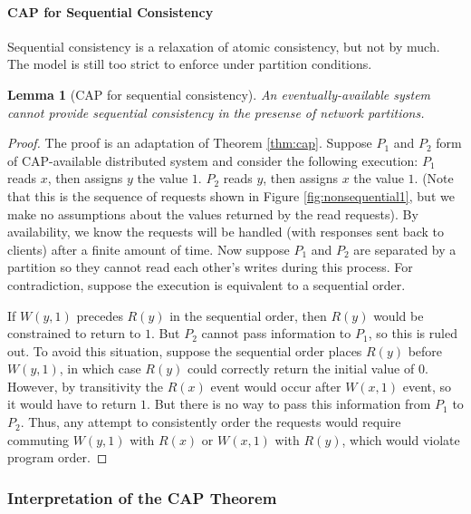 \documentclass[]             %
{NASA}                       %
\newtheorem{lemma}[theorem]{Lemma}
\theoremstyle{definition}
\begin{document}
\paragraph{CAP for Sequential Consistency}

Sequential consistency is a relaxation of atomic consistency, but not by
much. The model is still too strict to enforce under partition
conditions.

\begin{lemma}[CAP for sequential consistency]
    \label{thm:cap-sequential}
    An eventually-available system cannot provide sequential consistency in the presense of network partitions.
\end{lemma}
\begin{proof}

The proof is an adaptation of Theorem \ref{thm:cap}. Suppose $P_1$ and
$P_2$ form of CAP-available distributed system and consider the
following execution: $P_1$ reads $x$, then assigns $y$ the value
$1$. $P_2$ reads $y$, then assigns $x$ the value $1$. (Note that this
is the sequence of requests shown in Figure \ref{fig:nonsequential1},
but we make no assumptions about the values returned by the read
requests). By availability, we know the requests will be handled (with
responses sent back to clients) after a finite amount of time. Now
suppose $P_1$ and $P_2$ are separated by a partition so they cannot
read each other's writes during this process. For contradiction,
suppose the execution is equivalent to a sequential order.

If $W(y,1)$ precedes $R(y)$ in the sequential order, then $R(y)$ would
be constrained to return to $1$. But $P_2$ cannot pass information to
$P_1$, so this is ruled out. To avoid this situation, suppose the
sequential order places $R(y)$ before $W(y,1)$, in which case $R(y)$
could correctly return the initial value of $0$. However, by
transitivity the $R(x)$ event would occur after $W(x,1)$ event, so it
would have to return $1$. But there is no way to pass this information
from $P_1$ to $P_2$. Thus, any attempt to consistently order the
requests would require commuting $W(y,1)$ with $R(x)$ or $W(x,1)$ with
$R(y)$, which would violate program order.
\end{proof}


\hypertarget{interpretation-of-the-cap-theorem}{%
\subsubsection{Interpretation of the CAP
Theorem}\label{interpretation-of-the-cap-theorem}}
\end{document}
